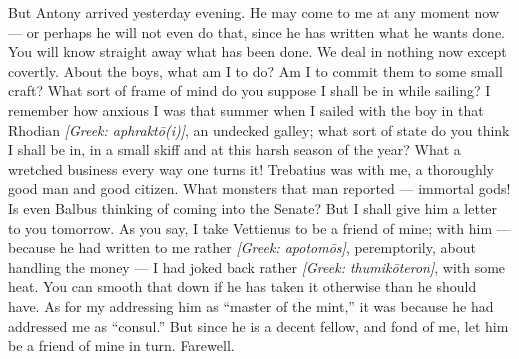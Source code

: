  But Antony arrived yesterday evening. He may come to me at any moment now --- or perhaps he will not even do that, since he has written what he wants done. You will know straight away what has been done. We deal in nothing now except covertly. About the boys, what am I to do? Am I to commit them to some small craft? What sort of frame of mind do you suppose I shall be in while sailing? I remember how anxious I was that summer when I sailed with the boy in that Rhodian \textit{[Greek: aphrakt\=o(i)]}, an undecked galley; what sort of state do you think I shall be in, in a small skiff and at this harsh season of the year? What a wretched business every way one turns it! Trebatius was with me, a thoroughly good man and good citizen. What monsters that man reported --- immortal gods! Is even Balbus thinking of coming into the Senate? But I shall give him a letter to you tomorrow. As you say, I take Vettienus to be a friend of mine; with him --- because he had written to me rather \textit{[Greek: apotom\=os]}, peremptorily, about handling the money --- I had joked back rather \textit{[Greek: thumik\=oteron]}, with some heat. You can smooth that down if he has taken it otherwise than he should have. As for my addressing him as ``master of the mint,'' it was because he had addressed me as ``consul.'' But since he is a decent fellow, and fond of me, let him be a friend of mine in turn. Farewell.

